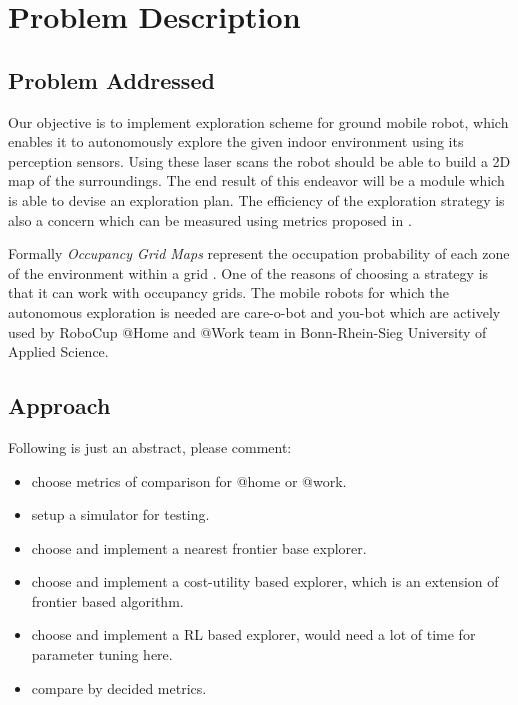 \section{Problem Description}

\subsection{Problem Addressed}
Our objective is to implement exploration scheme for ground mobile robot, which enables it to
autonomously explore the given indoor environment using its perception sensors.
Using these laser scans the robot should be able to build a 2D map of the surroundings.
The end result of this endeavor will be a module which is able to devise an exploration plan.
The efficiency of the exploration strategy is also a concern which can be measured using metrics
proposed in \cite{Yan2015}.
\par
Formally \textit{Occupancy Grid Maps} represent the occupation probability of each zone of the
environment within a grid \cite{Juliae2012}. One of the reasons of choosing a strategy is that
it can work with occupancy grids. The mobile robots for which the autonomous exploration is needed
are care-o-bot and you-bot which are actively used by RoboCup @Home and @Work team in
Bonn-Rhein-Sieg University of Applied Science.

\subsection{Approach}
Following is just an abstract, please comment:
\begin{itemize}
	\item choose metrics of comparison for @home or @work.
	\item setup a simulator for testing.
	\item choose and implement a nearest frontier base explorer.
	\item choose and implement a cost-utility based explorer, which is an extension of frontier based
	algorithm.
	\item choose and implement a RL based explorer, would need a lot of time for parameter tuning here.
	\item compare by decided metrics.
\end{itemize}


